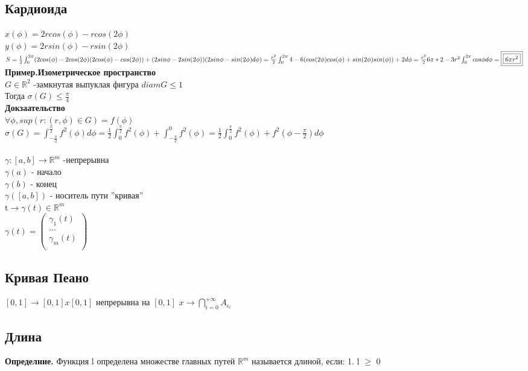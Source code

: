 \documentclass[12pt, a4paper]{article}
\newcommand{\nl}{\newline}
\begin{document}
	\subsection{Кардиоида}
	$x(\phi)= 2 r cos(\phi) - r cos(2\phi)$\\
	$y(\phi)= 2 r sin(\phi) - r sin(2\phi)$\\
	$S = \frac{1}{2}\int_{0}^{2\pi}(2cos(\phi)-2cos( 2\phi )( 2cos( \phi )-cos( 2\phi )) + (2sin\phi -2 sin(2\phi))(2sin\phi - sin(2\phi)d\phi) = \frac{r^2}{2}\int_{0}^{2\pi}4 -6( cos(2\phi)cos(\phi) + sin(2\phi)sin(\phi)) +2 d\phi = \frac{r^2}{2}6\pi * 2 - 3r^2\int_{0}^{2\pi}cos\phi d\phi =  \boxed{\boxed{6\pi r^2 }}\\
	$
	\\
	\textbf{Пример.Изометрическое пространство}\\
	$G \in \mathbb{R}^2$ -замкнутая выпуклая фигура
	$diam G\leq 1$\\ Тогда $\sigma(G) \leq \frac{\pi}{4}$\\
	\textbf{Докзаательство}\\
	$\forall \phi , sup(r : (r, \phi) \in G )= f(\phi)$ \\
	$\sigma(G)=\int_{-\frac{\pi}{2}}^{\frac{\pi}{2}}f^2(\phi) d\phi = \frac{1}{2}\int_{0}^{\frac{\pi}{2}}f^2(\phi)+\int_{-\frac{\pi}{2}}^{0}f^2(\phi)=\frac{1}{2}\int_{0}^{\frac{\pi}{2}}f^2(\phi) + f^2(\phi-\frac{\pi}{2})   d\phi$ \\
	\\
	$\gamma : [a,b] \rightarrow \mathbb{R}^m$ -непрерывна\\
	$\gamma(a)$ - начало \\
	$\gamma(b)$ - конец \\
	$\gamma([a,b])$ - носитель пути ''кривая'' \\
	t$\rightarrow \gamma(t) \in \mathbb{R}^m$ \\
	$\gamma(t)= 
	\begin{pmatrix}
	\gamma_1(t)\\
	\dots \\
	\gamma_m(t)\\
	\end{pmatrix}$
	
	\subsection{Кривая Пеано}
	$[0,1] \rightarrow [0,1]x[0,1]$ непрерывна на  $[0,1]$\nl
	$x \rightarrow \bigcap_{i=0}^{+\infty}A_{\epsilon_i}$ \nl
	
	\subsection{Длина}
	\textbf{Определние.} Функция l определена множестве главных путей $\mathbb{R}^m$ называется длиной, если: 
	1. l  $\geq$ 0 \\
	
\end{document}
